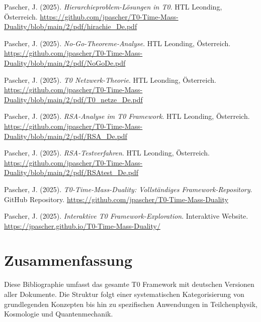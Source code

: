 \documentclass{article}
\begin{document}
\begin{thebibliography}{99}
		Pascher, J. (2025).
		\textit{Hierarchieproblem-Lösungen in T0}.
		HTL Leonding, Österreich.
		\url{https://github.com/jpascher/T0-Time-Mass-Duality/blob/main/2/pdf/hirachie_De.pdf}
		
		Pascher, J. (2025).
		\textit{No-Go-Theoreme-Analyse}.
		HTL Leonding, Österreich.
		\url{https://github.com/jpascher/T0-Time-Mass-Duality/blob/main/2/pdf/NoGoDe.pdf}
		
		Pascher, J. (2025).
		\textit{T0 Netzwerk-Theorie}.
		HTL Leonding, Österreich.
		\url{https://github.com/jpascher/T0-Time-Mass-Duality/blob/main/2/pdf/T0_netze_De.pdf}
		
		
		Pascher, J. (2025).
		\textit{RSA-Analyse im T0 Framework}.
		HTL Leonding, Österreich.
		\url{https://github.com/jpascher/T0-Time-Mass-Duality/blob/main/2/pdf/RSA_De.pdf}
		
		Pascher, J. (2025).
		\textit{RSA-Testverfahren}.
		HTL Leonding, Österreich.
		\url{https://github.com/jpascher/T0-Time-Mass-Duality/blob/main/2/pdf/RSAtest_De.pdf}
		
		
		Pascher, J. (2025).
		\textit{T0-Time-Mass-Duality: Vollständiges Framework-Repository}.
		GitHub Repository.
		\url{https://github.com/jpascher/T0-Time-Mass-Duality}
		
		Pascher, J. (2025).
		\textit{Interaktive T0 Framework-Exploration}.
		Interaktive Website.
		\url{https://jpascher.github.io/T0-Time-Mass-Duality/}
		
	\end{thebibliography}
	
	\section{Zusammenfassung}
	Diese Bibliographie umfasst das gesamte T0 Framework mit deutschen Versionen aller Dokumente. Die Struktur folgt einer systematischen Kategorisierung von grundlegenden Konzepten bis hin zu spezifischen Anwendungen in Teilchenphysik, Kosmologie und Quantenmechanik.
	
\end{document}
